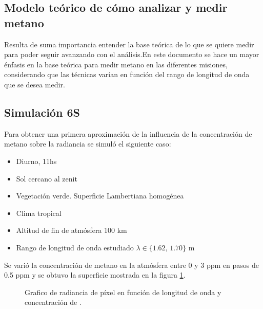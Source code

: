 \documentclass[11pt,titlepage]{article}
\begin{document}
 
\subsection{Modelo teórico de cómo analizar y medir metano}
Resulta de suma importancia entender la base teórica de lo que se quiere medir para poder seguir avanzando con el análisis.En este documento se hace un mayor énfasis en la base teórica para medir metano en las diferentes misiones, considerando que las técnicas varían en función del rango de longitud de onda que se desea medir.

\subsection{Simulación 6S}
Para obtener una primera aproximación de la influencia de la concentración de metano sobre la radiancia se simuló el siguiente caso:
\begin{itemize}
    \item Diurno, 11hs
    \item Sol cercano al zenit
    \item Vegetación verde. Superficie Lambertiana homogénea
    \item Clima tropical
    \item Altitud de fin de atmósfera 100 km
    \item Rango de longitud de onda estudiado $\lambda \in \{ 1.62, \, 1.70\}$ \micro m
\end{itemize}

Se varió la concentración de metano en la atmósfera entre 0 y 3 ppm en pasos de 0.5 ppm y se obtuvo la superficie mostrada en la figura \ref{fig:ch4IrrVsPpm}.


\begin{figure}[htb!]
\centering
\pgfplotsset{colormap/jet}
	\caption{Grafico  de radiancia de píxel en función de longitud de onda y concentración de \metano.}
	\label{fig:ch4IrrVsPpm}
\end{figure}
\end{document}
